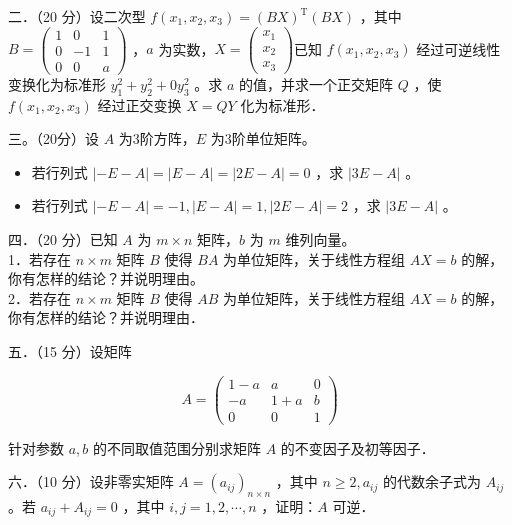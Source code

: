 \documentclass{article}
\begin{document}
二．（20 分）设二次型 \(f\left(x_{1}, x_{2}, x_{3}\right)=(B X)^{\mathrm{T}}(B X)\) ，其中 \(B=\left(\begin{array}{ccc}1 & 0 & 1 \\ 0 & -1 & 1 \\ 0 & 0 & a\end{array}\right)\) ，\(a\) 为实数，\(X=\left(\begin{array}{l}x_{1} \\ x_{2} \\ x_{3}\end{array}\right)\)已知 \(f\left(x_{1}, x_{2}, x_{3}\right)\) 经过可逆线性变换化为标准形 \(y_{1}^{2}+y_{2}^{2}+0 y_{3}^{2}\) 。求 \(a\) 的值，并求一个正交矩阵 \(Q\) ，使\(f\left(x_{1}, x_{2}, x_{3}\right)\) 经过正交变换 \(X=Q Y\) 化为标准形．

三。（20分）设 \(A\) 为3阶方阵，\(E\) 为3阶单位矩阵。

\begin{itemize}

  \item[1．] 若行列式 \(|-E-A|=|E-A|=|2 E-A|=0\) ，求 \(|3 E-A|\) 。

  \item[2．] 若行列式 \(|-E-A|=-1,|E-A|=1,|2 E-A|=2\) ，求 \(|3 E-A|\) 。
\end{itemize}

四．（20 分）已知 \(A\) 为 \(m \times n\) 矩阵，\(b\) 为 \(m\) 维列向量。\\

1．若存在 \(n \times m\) 矩阵 \(B\) 使得 \(B A\) 为单位矩阵，关于线性方程组 \(A X=b\) 的解，你有怎样的结论？并说明理由。\\

2．若存在 \(n \times m\) 矩阵 \(B\) 使得 \(A B\) 为单位矩阵，关于线性方程组 \(A X=b\) 的解，你有怎样的结论？并说明理由．

五．（15 分）设矩阵

\[
A=\left(\begin{array}{ccc}
1-a & a & 0 \\
-a & 1+a & b \\
0 & 0 & 1
\end{array}\right)
\]

针对参数 \(a, b\) 的不同取值范围分别求矩阵 \(A\) 的不变因子及初等因子．

六．（10 分）设非零实矩阵 \(A=\left(a_{i j}\right)_{n \times n}\) ，其中 \(n \geq 2, a_{i j}\) 的代数余子式为 \(A_{i j}\) 。若 \(a_{i j}+A_{i j}=0\) ，其中 \(i, j=1,2, \cdots, n\) ，证明：\(A\) 可逆．
\end{document}

